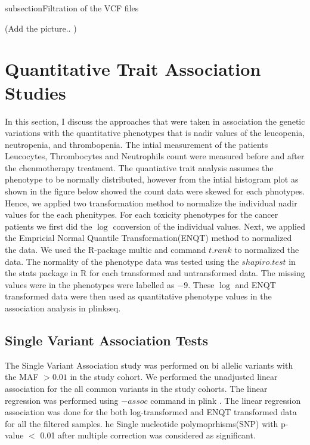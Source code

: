 subsection{Filtration of the VCF files}

(Add the picture.. )
 
\section{Quantitative Trait Association Studies}
\label{Quantitative Trait Association studies}



In this section, I discuss the approaches that were taken in association the genetic variations with the quantitative phenotypes that is nadir values of the leucopenia, neutropenia, and thrombopenia. The intial measurement of the patients Leucocytes, Thrombocytes and Neutrophils count were measured before and after the chenmotherapy treatment. The quantiative trait analysis assumes the phenotype to be normally distributed, however from the intial histogram plot as shown in the figure below showed the count data were skewed for each phnotypes. Hence, we applied two transformation method to normalize the individual nadir values for the each phenitypes. For each toxicity phenotypes for the cancer patients we first did the $\log$ conversion of the individual values. Next, we applied the Empricial Normal Quantile Transformation(ENQT) method to normalized the data. We used the R-package multic \cite{multic} and command $t.rank$ to normalized the data. The normality of the phenotype data was tested using the $shapiro.test$ in the stats package in R \cite{Rprogram} for each transformed and untransformed data. The missing values were in the phenotypes were labelled as $-9$. These $\log$ and ENQT transformed data were then used as quantitative phenotype values in the association analysis in plinkseq\cite{Doe:2009:Online}. 


\subsection{Single Variant Association Tests}

 The Single Variant Association study was performed on bi allelic variants with the MAF $> 0.01$ in the study cohort. We performed the unadjusted linear association for the all common variants in the study cohorts. The linear regression was performed using $-assoc$ command in plink \cite{purcell2007plink}. The linear regression association was done for the both log-transformed and ENQT transformed data for all the filtered samples. he Single nucleotide polymoprhisms(SNP) with p-value $<$ 0.01 after multiple correction was considered as significant. 

